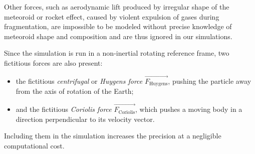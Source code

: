     Other forces, such as aerodynamic lift produced by irregular shape of the meteoroid
    or rocket effect, caused by violent expulsion of gases during fragmentation,
    are impossible to be modeled without precise knowledge of meteoroid shape and composition
    and are thus ignored in our simulations.

    Since the simulation is run in a non-inertial rotating reference frame, two fictitious forces are also present:
    \begin{itemize}
        \item the fictitious \emph{centrifugal} or \emph{Huygens force} $\vec{F_{\mathrm{Huygens}}}$,
            pushing the particle away from the axis of rotation of the Earth;
        \item and the fictitious \emph{Coriolis force} $\vec{F_{\mathrm{Coriolis}}}$,
            which pushes a moving body in a direction perpendicular to its velocity vector.
    \end{itemize}
    Including them in the simulation increases the precision at a negligible computational cost.
%
%
%

